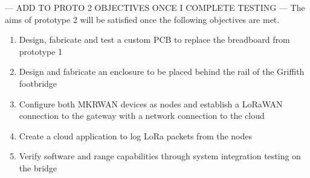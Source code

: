 --- ADD TO PROTO 2 OBJECTIVES ONCE I COMPLETE TESTING ---
The aims of prototype 2 will be satisfied once the following objectives are met.

\begin{enumerate}
	\item{Design, fabricate and test a custom PCB to replace the breadboard from prototype 1}
	\item{Design and fabricate an enclosure to be placed behind the rail of the Griffith footbridge}
	\item{Configure both MKRWAN devices as nodes and establish a LoRaWAN connection to the gateway with a network connection to the cloud}
	\item{Create a cloud application to log LoRa packets from the nodes}
	\item{Verify software and range capabilities through system integration testing on the bridge}
\end{enumerate}


